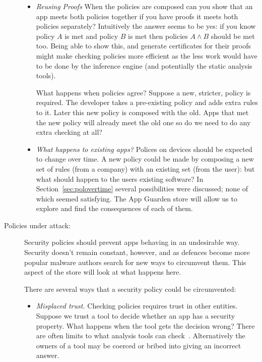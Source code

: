 \documentclass[a4paper]{article}
\begin{document}
\begin{description}
\begin{itemize}
      \item \emph{Reusing Proofs}
        When the policies are composed can you show that an app meets both
        policies together if you have proofs it meets both policies separately?
        Intuitively the answer seems to be yes: if you know policy $A$ is met
        and policy $B$ is met then policies $A\wedge B$ should be met too.
        Being able to show this, and generate certificates for their proofs
        might make checking policies more efficient as the less work would have
        to be done by the inference engine (and potentially the static analysis
        tools).

        What happens when policies agree? Suppose a new, stricter,
        policy is required.  The developer takes a pre-existing policy and adds
        extra rules to it.  Later this new policy is composed with the old.
        Apps that met the new policy will already meet the old one so do we need
        to do any extra checking at all?  

      \item \emph{What happens to existing apps?} Polices on devices should be
        expected to change over time.  A new policy could be made by composing a
        new set of rules (from a company) with an existing set (from the user):
        but what should happen to the users existing software?  In
        Section~\ref{sec:polovertime} several possibilities were discussed; none
        of which seemed satisfying.  The App Guarden store will allow us to
        explore and find the consequences of each of them.
        
    \end{itemize}

  \item[Policies under attack:]  Security policies should prevent apps behaving
    in an undesirable way.  Security doesn't remain constant, however, and as
    defences become more popular malware authors search for new ways to
    circumvent them.  This aspect of the store will look at what happens here.

    There are several ways that a security policy could be circumvented:

    \begin{itemize} 
      
      \item \emph{Misplaced trust.}  Checking policies requires trust in other
        entities.  Suppose we trust a tool to decide whether an app has a
        security property.  What happens when the tool gets the decision wrong?
        There are often limits to what analysis tools can
        check~\cite{Livshits:ww}.  Alternatively the owners of a tool may be
        coerced or bribed into giving an incorrect answer.  
        

\end{itemize}
\end{description}
\end{document}
